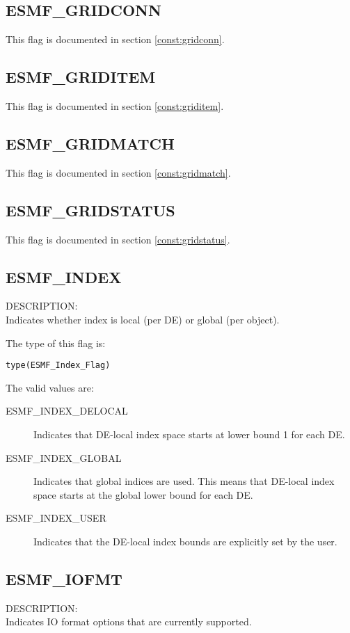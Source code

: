 \subsection{ESMF\_GRIDCONN}
This flag is documented in section \ref{const:gridconn}.

\subsection{ESMF\_GRIDITEM}
This flag is documented in section \ref{const:griditem}.

\subsection{ESMF\_GRIDMATCH}
This flag is documented in section \ref{const:gridmatch}.

\subsection{ESMF\_GRIDSTATUS}
This flag is documented in section \ref{const:gridstatus}.

\subsection{ESMF\_INDEX}
\label{const:indexflag}
{\sf DESCRIPTION:\\}
Indicates whether index is local (per DE) or global (per object).

The type of this flag is:

{\tt type(ESMF\_Index\_Flag)}

The valid values are:
\begin{description}
\item [ESMF\_INDEX\_DELOCAL]
      Indicates that DE-local index space starts at lower bound 1 for each DE.
\item [ESMF\_INDEX\_GLOBAL]
      Indicates that global indices are used. This means that DE-local index
      space starts at the global lower bound for each DE.
\item [ESMF\_INDEX\_USER]
      Indicates that the DE-local index bounds are explicitly set by the user.
\end{description}

\subsection{ESMF\_IOFMT}
\label{opt:iofmtflag}
{\sf DESCRIPTION:\\}
Indicates IO format options that are currently supported.

